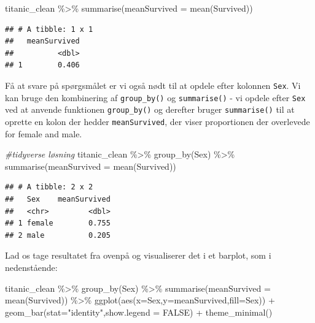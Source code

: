 \documentclass[
]{book}
\newenvironment{Shaded}{\begin{snugshade}}{\end{snugshade}}
\newcommand{\AttributeTok}[1]{\textcolor[rgb]{0.77,0.63,0.00}{#1}}
\newcommand{\CommentTok}[1]{\textcolor[rgb]{0.56,0.35,0.01}{\textit{#1}}}
\newcommand{\ConstantTok}[1]{\textcolor[rgb]{0.00,0.00,0.00}{#1}}
\newcommand{\FunctionTok}[1]{\textcolor[rgb]{0.00,0.00,0.00}{#1}}
\newcommand{\NormalTok}[1]{#1}
\newcommand{\SpecialCharTok}[1]{\textcolor[rgb]{0.00,0.00,0.00}{#1}}
\newcommand{\StringTok}[1]{\textcolor[rgb]{0.31,0.60,0.02}{#1}}
\begin{document}
\begin{Shaded}
\begin{Highlighting}[]
\NormalTok{titanic\_clean }\SpecialCharTok{\%\textgreater{}\%}  
  \FunctionTok{summarise}\NormalTok{(}\AttributeTok{meanSurvived =} \FunctionTok{mean}\NormalTok{(Survived))}
\end{Highlighting}
\end{Shaded}

\begin{verbatim}
## # A tibble: 1 x 1
##   meanSurvived
##          <dbl>
## 1        0.406
\end{verbatim}

Få at svare på spørgsmålet er vi også nødt til at opdele efter kolonnen \texttt{Sex}. Vi kan bruge den kombinering af \texttt{group\_by()} og \texttt{summarise()} - vi opdele efter \texttt{Sex} ved at anvende funktionen \texttt{group\_by()} og derefter bruger \texttt{summarise()} til at oprette en kolon der hedder \texttt{meanSurvived}, der viser proportionen der overlevede for female and male.

\begin{Shaded}
\begin{Highlighting}[]
\CommentTok{\#tidyverse løsning}
\NormalTok{titanic\_clean }\SpecialCharTok{\%\textgreater{}\%}
    \FunctionTok{group\_by}\NormalTok{(Sex) }\SpecialCharTok{\%\textgreater{}\%}
    \FunctionTok{summarise}\NormalTok{(}\AttributeTok{meanSurvived =} \FunctionTok{mean}\NormalTok{(Survived))}
\end{Highlighting}
\end{Shaded}

\begin{verbatim}
## # A tibble: 2 x 2
##   Sex    meanSurvived
##   <chr>         <dbl>
## 1 female        0.755
## 2 male          0.205
\end{verbatim}

Lad os tage resultatet fra ovenpå og visualiserer det i et barplot, som i nedenstående:

\begin{Shaded}
\begin{Highlighting}[]
\NormalTok{titanic\_clean }\SpecialCharTok{\%\textgreater{}\%}  
  \FunctionTok{group\_by}\NormalTok{(Sex) }\SpecialCharTok{\%\textgreater{}\%} 
  \FunctionTok{summarise}\NormalTok{(}\AttributeTok{meanSurvived =} \FunctionTok{mean}\NormalTok{(Survived)) }\SpecialCharTok{\%\textgreater{}\%}
  \FunctionTok{ggplot}\NormalTok{(}\FunctionTok{aes}\NormalTok{(}\AttributeTok{x=}\NormalTok{Sex,}\AttributeTok{y=}\NormalTok{meanSurvived,}\AttributeTok{fill=}\NormalTok{Sex)) }\SpecialCharTok{+} 
  \FunctionTok{geom\_bar}\NormalTok{(}\AttributeTok{stat=}\StringTok{"identity"}\NormalTok{,}\AttributeTok{show.legend =} \ConstantTok{FALSE}\NormalTok{) }\SpecialCharTok{+} \FunctionTok{theme\_minimal}\NormalTok{()}
\end{Highlighting}
\end{Shaded}
\end{document}
